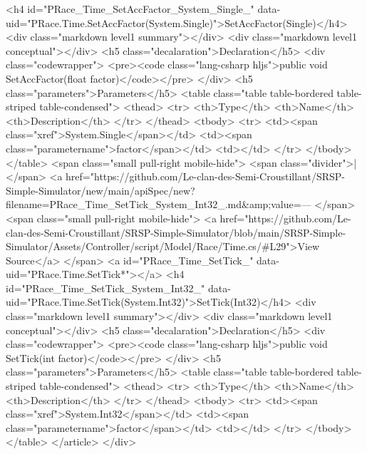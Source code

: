   <h4 id="PRace_Time_SetAccFactor_System_Single_" data-uid="PRace.Time.SetAccFactor(System.Single)">SetAccFactor(Single)</h4>
  <div class="markdown level1 summary"></div>
  <div class="markdown level1 conceptual"></div>
  <h5 class="decalaration">Declaration</h5>
  <div class="codewrapper">
    <pre><code class="lang-csharp hljs">public void SetAccFactor(float factor)</code></pre>
  </div>
  <h5 class="parameters">Parameters</h5>
  <table class="table table-bordered table-striped table-condensed">
    <thead>
      <tr>
        <th>Type</th>
        <th>Name</th>
        <th>Description</th>
      </tr>
    </thead>
    <tbody>
      <tr>
        <td><span class="xref">System.Single</span></td>
        <td><span class="parametername">factor</span></td>
        <td></td>
      </tr>
    </tbody>
  </table>
  <span class="small pull-right mobile-hide">
    <span class="divider">|</span>
    <a href="https://github.com/Le-clan-des-Semi-Croustillant/SRSP-Simple-Simulator/new/main/apiSpec/new?filename=PRace_Time_SetTick_System_Int32_.md&amp;value=---%
  </span>
  <span class="small pull-right mobile-hide">
    <a href="https://github.com/Le-clan-des-Semi-Croustillant/SRSP-Simple-Simulator/blob/main/SRSP-Simple-Simulator/Assets/Controller/script/Model/Race/Time.cs/#L29">View Source</a>
  </span>
  <a id="PRace_Time_SetTick_" data-uid="PRace.Time.SetTick*"></a>
  <h4 id="PRace_Time_SetTick_System_Int32_" data-uid="PRace.Time.SetTick(System.Int32)">SetTick(Int32)</h4>
  <div class="markdown level1 summary"></div>
  <div class="markdown level1 conceptual"></div>
  <h5 class="decalaration">Declaration</h5>
  <div class="codewrapper">
    <pre><code class="lang-csharp hljs">public void SetTick(int factor)</code></pre>
  </div>
  <h5 class="parameters">Parameters</h5>
  <table class="table table-bordered table-striped table-condensed">
    <thead>
      <tr>
        <th>Type</th>
        <th>Name</th>
        <th>Description</th>
      </tr>
    </thead>
    <tbody>
      <tr>
        <td><span class="xref">System.Int32</span></td>
        <td><span class="parametername">factor</span></td>
        <td></td>
      </tr>
    </tbody>
  </table>
</article>
          </div>
          
